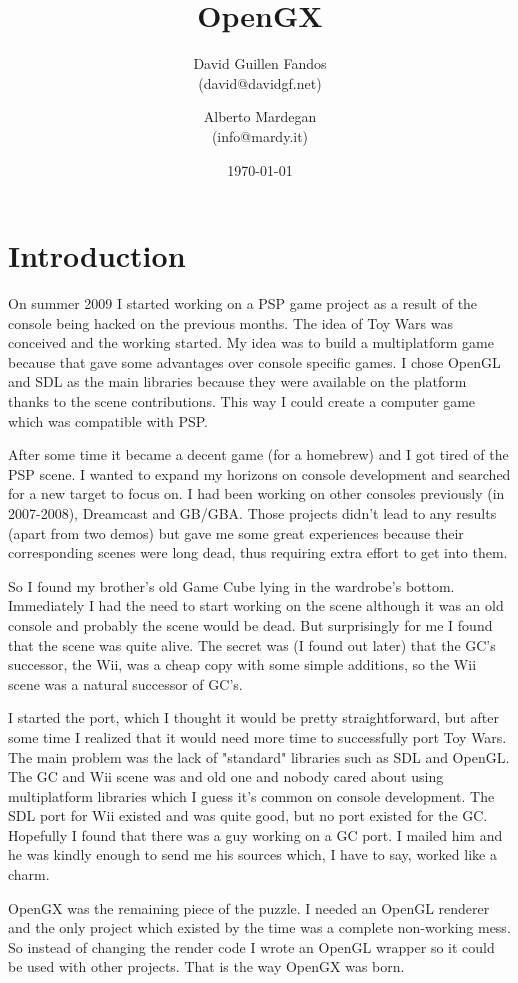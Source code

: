 \documentclass[12pt]{article}
\title{\textbf{\huge{OpenGX}}}
\author{
    David Guillen Fandos \\ \small{(david@davidgf.net)}
    \and
    Alberto Mardegan \\ \small{(info@mardy.it)}
}
\date{\today}
\begin{document}
\maketitle

\section{Introduction}
On summer 2009 I started working on a PSP game project as a result of the console being hacked on the previous months. The idea of Toy Wars was conceived and the working started. My idea was to build a multiplatform game because that gave some advantages over console specific games. I chose OpenGL and SDL as the main libraries because they were available on the platform thanks to the scene contributions. This way I could create a computer game which was compatible with PSP.

After some time it became a decent game (for a homebrew) and I got tired of the PSP scene. I wanted to expand my horizons on console development and searched for a new target to focus on. I had been working on other consoles previously (in 2007-2008), Dreamcast and GB/GBA. Those projects didn't lead to any results (apart from two demos) but gave me some great experiences because their corresponding scenes were long dead, thus requiring extra effort to get into them.

So I found my brother's old Game Cube lying in the wardrobe's bottom. Immediately I had the need to start working on the scene although it was an old console and probably the scene would be dead. But surprisingly for me I found that the scene was quite alive. The secret was (I found out later) that the GC's successor, the Wii, was a cheap copy with some simple additions, so the Wii scene was a natural successor of GC's.

I started the port, which I thought it would be pretty straightforward, but after some time I realized that it would need more time to successfully port Toy Wars. The main problem was the lack of "standard" libraries such as SDL and OpenGL. The GC and Wii scene was and old one and nobody cared about using multiplatform libraries which I guess it's common on console development. The SDL port for Wii existed and was quite good, but no port existed for the GC. Hopefully I found that there was a guy working on a GC port. I mailed him and he was kindly enough to send me his sources which, I have to say, worked like a charm.

OpenGX was the remaining piece of the puzzle. I needed an OpenGL renderer and the only project which existed by the time was a complete non-working mess. So instead of changing the render code I wrote an OpenGL wrapper so it could be used with other projects. That is the way OpenGX was born.
\end{document}
